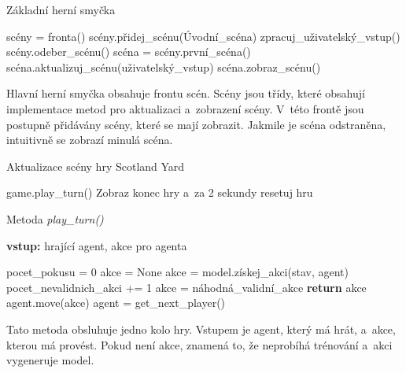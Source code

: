 \begin{algorithm}[H]
  \begin{algorithmic}
    \caption{Základní herní smyčka}
    \label{alg:GameController}
      \State scény = fronta()
      \State scény.přidej\_scénu(Úvodní\_scéna)
      \State
        \State zpracuj\_uživatelský\_vstup()
          \State scény.odeber\_scénu()
        \EndIf
        \State scéna = scény.první\_scéna()
        \State scéna.aktualizuj\_scénu(uživatelský\_vstup)
        \State scéna.zobraz\_scénu()
      \EndWhile
  \end{algorithmic}
\end{algorithm}

Hlavní herní smyčka obsahuje frontu scén.
Scény jsou třídy, které obsahují implementace metod pro aktualizaci a~zobrazení scény.
V~této frontě jsou postupně přidávány scény, které se mají zobrazit.
Jakmile je scéna odstraněna, intuitivně se zobrazí minulá scéna.

\begin{algorithm}[H]
  \caption{Aktualizace scény hry Scotland Yard}
  \label{alg:GameScene}
  \begin{algorithmic}
      \State game.play\_turn()
        \State Zobraz konec hry a~za 2 sekundy resetuj hru
      \EndIf
    \EndIf
  \end{algorithmic}
\end{algorithm}

\begin{algorithm}[H]
  \caption{Metoda \emph{play\_turn()}}
  \label{alg:play_turn}
  \begin{algorithmic}
    \State \textbf{vstup:} hrající agent, akce pro agenta
    \State

      \State pocet\_pokusu = 0
      \State akce = None
          \State akce = model.získej\_akci(stav, agent)
          \State pocet\_nevalidnich\_akci += 1
        \Else
        \State akce = náhodná\_validní\_akce
        \EndIf
      \EndWhile
      \State \textbf{return} akce
    \EndIf
    \State agent.move(akce)
    \State agent = get\_next\_player()
  \end{algorithmic}
\end{algorithm}

Tato metoda obsluhuje jedno kolo hry.
Vstupem je agent, který má hrát, a~akce, kterou má provést.
Pokud není akce, znamená to, že neprobíhá trénování a~akci vygeneruje model.

